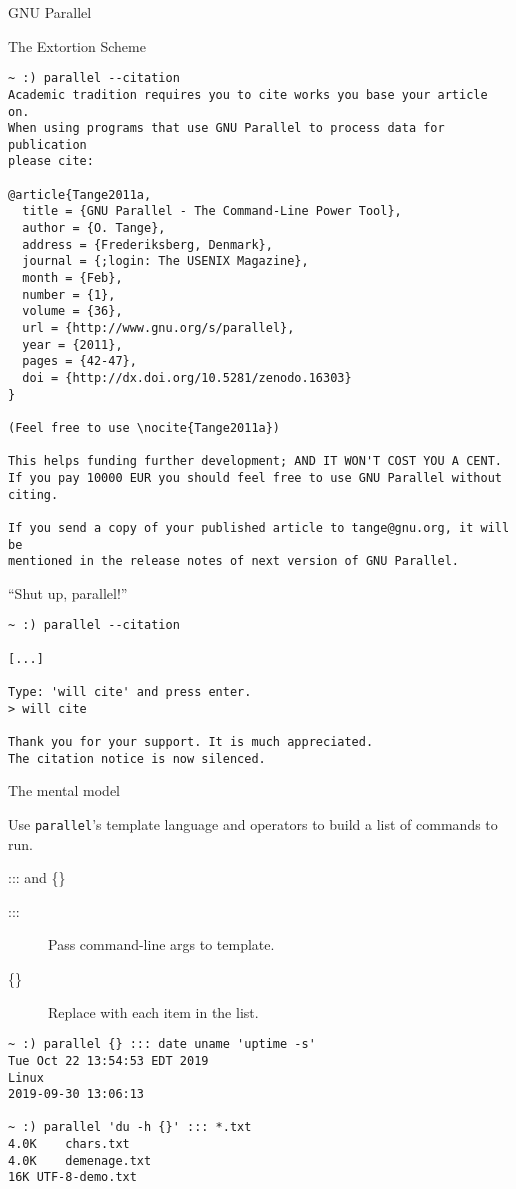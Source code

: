 \documentclass{beamer}
\renewcommand\big[1]{
  \begin{center}
    \Large{#1}
  \end{center}
}
\begin{document}
\begin{frame}
  \centering\Huge{GNU Parallel}
\end{frame}

\begin{frame}[fragile]
    \big{The Extortion Scheme}
\tiny
\begin{verbatim}
~ :) parallel --citation
Academic tradition requires you to cite works you base your article on.
When using programs that use GNU Parallel to process data for publication
please cite:

@article{Tange2011a,
  title = {GNU Parallel - The Command-Line Power Tool},
  author = {O. Tange},
  address = {Frederiksberg, Denmark},
  journal = {;login: The USENIX Magazine},
  month = {Feb},
  number = {1},
  volume = {36},
  url = {http://www.gnu.org/s/parallel},
  year = {2011},
  pages = {42-47},
  doi = {http://dx.doi.org/10.5281/zenodo.16303}
}

(Feel free to use \nocite{Tange2011a})

This helps funding further development; AND IT WON'T COST YOU A CENT.
If you pay 10000 EUR you should feel free to use GNU Parallel without citing.

If you send a copy of your published article to tange@gnu.org, it will be
mentioned in the release notes of next version of GNU Parallel.
\end{verbatim}
\end{frame}

\begin{frame}[fragile]
\big{``Shut up, parallel!''}
\begin{verbatim}
~ :) parallel --citation

[...]

Type: 'will cite' and press enter.
> will cite

Thank you for your support. It is much appreciated.
The citation notice is now silenced.
\end{verbatim}
\end{frame}

\begin{frame}
\big{The mental model}

Use \texttt{parallel}'s template language and operators to build a list of commands to run.
\end{frame}

\begin{frame}[fragile]
\big{::: and \{\}}
\begin{description}
    \item[:::] Pass command-line args to template.
    \item[\{\}] Replace with each item in the list.
\end{description}

\begin{verbatim}
~ :) parallel {} ::: date uname 'uptime -s'
Tue Oct 22 13:54:53 EDT 2019
Linux
2019-09-30 13:06:13

~ :) parallel 'du -h {}' ::: *.txt
4.0K	chars.txt
4.0K	demenage.txt
16K	UTF-8-demo.txt
\end{verbatim}
\end{frame}
\end{document}

